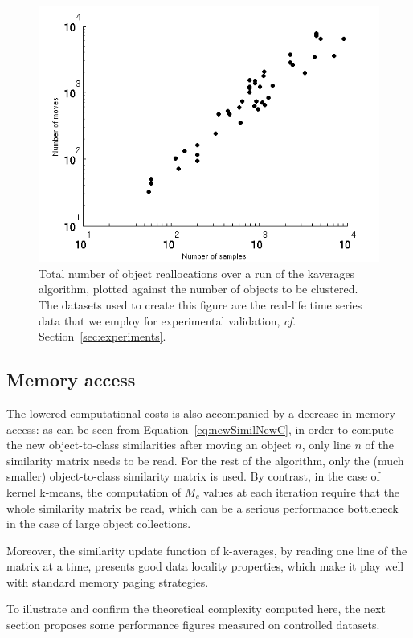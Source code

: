 \documentclass[a4paper,twoside]{article}
\begin{document}
\begin{figure}
\center
\includegraphics[scale=0.6]{figures/sampleMove.png} 
\caption{Total number of object reallocations over a run of the kaverages algorithm, plotted against the number of objects to be clustered. The datasets used to create this figure are the real-life time series data that we employ for experimental validation, \textit{cf.} Section~\ref{sec:experiments}.}
\label{fig:totalMoved}
\end{figure}

\subsection{Memory access}

The lowered computational costs is also accompanied by a decrease in memory access: as can be seen from Equation~\ref{eq:newSimilNewC}, in order to compute the new object-to-class similarities after moving an object $n$, only line $n$ of the similarity matrix needs to be read. For the rest of the algorithm, only the (much smaller) object-to-class similarity matrix is used. By contrast, in the case of kernel k-means, the computation of $M_c$ values at each iteration require that the whole similarity matrix be read, which can be a serious performance bottleneck in the case of large object collections.

Moreover, the similarity update function of k-averages, by reading one line of the matrix at a time, presents good data locality properties, which make it play well with standard memory paging strategies.

To illustrate and confirm the theoretical complexity computed here, the next section proposes some performance figures measured on controlled datasets.
\end{document}
